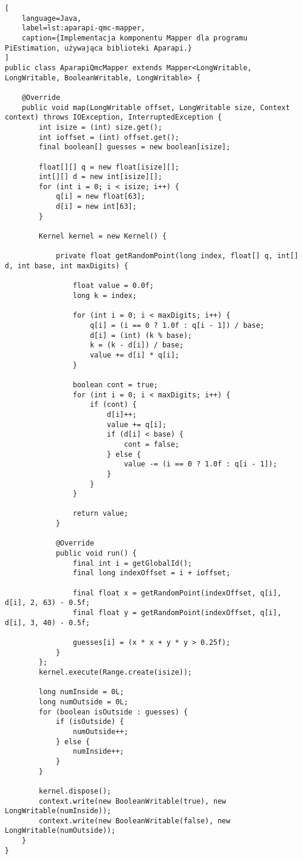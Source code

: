 \begin{lstlisting}[
    language=Java,
    label=lst:aparapi-qmc-mapper,
    caption={Implementacja komponentu Mapper dla programu PiEstimation, używająca biblioteki Aparapi.}
]
public class AparapiQmcMapper extends Mapper<LongWritable, LongWritable, BooleanWritable, LongWritable> {

    @Override
    public void map(LongWritable offset, LongWritable size, Context context) throws IOException, InterruptedException {
        int isize = (int) size.get();
        int ioffset = (int) offset.get();
        final boolean[] guesses = new boolean[isize];

        float[][] q = new float[isize][];
        int[][] d = new int[isize][];
        for (int i = 0; i < isize; i++) {
            q[i] = new float[63];
            d[i] = new int[63];
        }

        Kernel kernel = new Kernel() {

            private float getRandomPoint(long index, float[] q, int[] d, int base, int maxDigits) {

                float value = 0.0f;
                long k = index;

                for (int i = 0; i < maxDigits; i++) {
                    q[i] = (i == 0 ? 1.0f : q[i - 1]) / base;
                    d[i] = (int) (k % base);
                    k = (k - d[i]) / base;
                    value += d[i] * q[i];
                }

                boolean cont = true;
                for (int i = 0; i < maxDigits; i++) {
                    if (cont) {
                        d[i]++;
                        value += q[i];
                        if (d[i] < base) {
                            cont = false;
                        } else {
                            value -= (i == 0 ? 1.0f : q[i - 1]);
                        }
                    }
                }

                return value;
            }

            @Override
            public void run() {
                final int i = getGlobalId();
                final long indexOffset = i + ioffset;

                final float x = getRandomPoint(indexOffset, q[i], d[i], 2, 63) - 0.5f;
                final float y = getRandomPoint(indexOffset, q[i], d[i], 3, 40) - 0.5f;

                guesses[i] = (x * x + y * y > 0.25f);
            }
        };
        kernel.execute(Range.create(isize));

        long numInside = 0L;
        long numOutside = 0L;
        for (boolean isOutside : guesses) {
            if (isOutside) {
                numOutside++;
            } else {
                numInside++;
            }
        }

        kernel.dispose();
        context.write(new BooleanWritable(true), new LongWritable(numInside));
        context.write(new BooleanWritable(false), new LongWritable(numOutside));
    }
}
\end{lstlisting}
\newpage

